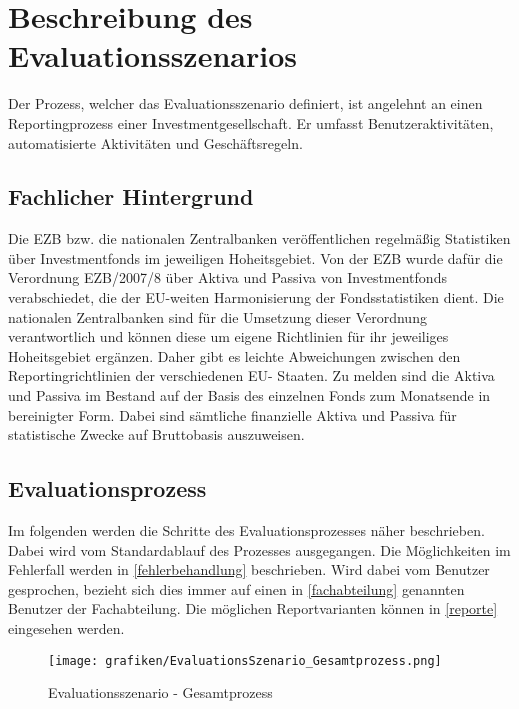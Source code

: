 
\section{Beschreibung des Evaluationsszenarios}
\label{Evaluationsszenario}
Der Prozess, welcher das Evaluationsszenario definiert, ist angelehnt an einen Reportingprozess einer Investmentgesellschaft. Er umfasst Benutzeraktivitäten, automatisierte Aktivitäten und Geschäftsregeln.

\subsection{Fachlicher Hintergrund}
\label{fachProzess}
Die \ac{EZB} bzw. die nationalen Zentralbanken veröffentlichen regelmäßig Statistiken über Investmentfonds im jeweiligen Hoheitsgebiet. Von der \ac{EZB} wurde dafür die Verordnung EZB/2007/8 über Aktiva und Passiva von Investmentfonds verabschiedet, die der EU-weiten Harmonisierung der Fondsstatistiken dient. Die nationalen Zentralbanken sind für die Umsetzung dieser Verordnung verantwortlich und können diese um eigene Richtlinien für ihr jeweiliges Hoheitsgebiet ergänzen. Daher gibt es leichte Abweichungen zwischen den Reportingrichtlinien der verschiedenen EU- Staaten.
Zu melden sind die Aktiva und Passiva im Bestand auf der Basis des einzelnen Fonds zum Monatsende in bereinigter Form. Dabei sind sämtliche finanzielle Aktiva und Passiva für statistische Zwecke auf Bruttobasis auszuweisen. 


\subsection{Evaluationsprozess}
Im folgenden werden die Schritte des Evaluationsprozesses näher beschrieben. Dabei wird vom Standardablauf des Prozesses ausgegangen. Die Möglichkeiten im Fehlerfall werden in \ref{fehlerbehandlung} beschrieben. Wird dabei vom Benutzer gesprochen, bezieht sich dies immer auf einen in \ref{fachabteilung} genannten Benutzer der Fachabteilung. Die möglichen Reportvarianten können in \ref{reporte} eingesehen werden.

\begin{figure}[!h]
	\caption{Evaluationsszenario - Gesamtprozess}
	\centering
		\texttt{[image: grafiken/EvaluationsSzenario\_Gesamtprozess.png]}
	\label{fig:gesamtprozess}
\end{figure}

